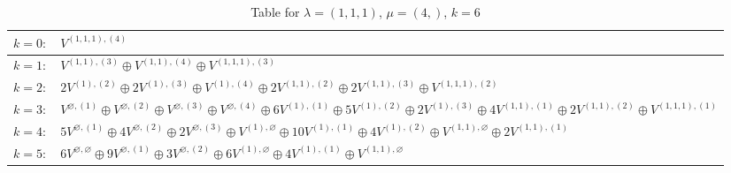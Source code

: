 \documentclass[a4paper,12pt]{article}
\begin{document}
\renewcommand{\arraystretch}{1.6} 
\begin{table}[H]
\centering
\caption{Table for $\lambda = (1, 1, 1)$, $\mu = (4,)$, $k = 6$}
\begin{tabular}{|>{\centering\arraybackslash}p{15cm}|}
\hline
 $k = 0: \quad V^{(1, 1, 1), (4)} $ \\ \hline
 $k = 1: \quad V^{(1, 1), (3)} \oplus V^{(1, 1), (4)} \oplus V^{(1, 1, 1), (3)} $ \\ \hline
 $k = 2: \quad 2 V^{(1), (2)} \oplus 2 V^{(1), (3)} \oplus V^{(1), (4)} \oplus 2 V^{(1, 1), (2)} \oplus 2 V^{(1, 1), (3)} \oplus V^{(1, 1, 1), (2)} $ \\ \hline
 $k = 3: \quad V^{\varnothing, (1)} \oplus V^{\varnothing, (2)} \oplus V^{\varnothing, (3)} \oplus V^{\varnothing, (4)} \oplus 6 V^{(1), (1)} \oplus 5 V^{(1), (2)} \oplus 2 V^{(1), (3)} \oplus 4 V^{(1, 1), (1)} \oplus 2 V^{(1, 1), (2)} \oplus V^{(1, 1, 1), (1)} $ \\ \hline
 $k = 4: \quad 5 V^{\varnothing, (1)} \oplus 4 V^{\varnothing, (2)} \oplus 2 V^{\varnothing, (3)} \oplus V^{(1), \varnothing} \oplus 10 V^{(1), (1)} \oplus 4 V^{(1), (2)} \oplus V^{(1, 1), \varnothing} \oplus 2 V^{(1, 1), (1)} $ \\ \hline
 $k = 5: \quad 6 V^{\varnothing, \varnothing} \oplus 9 V^{\varnothing, (1)} \oplus 3 V^{\varnothing, (2)} \oplus 6 V^{(1), \varnothing} \oplus 4 V^{(1), (1)} \oplus V^{(1, 1), \varnothing} $ \\ \hline
\end{tabular}
\end{table}
\end{document}
